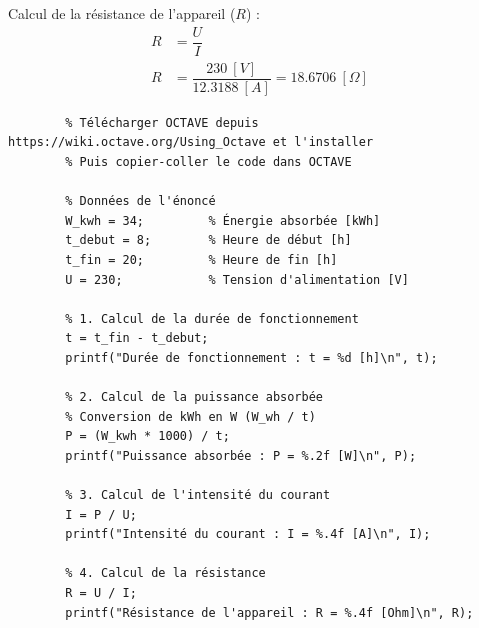 \documentclass[a4paper,11pt,answers,addpoints]{exam}
\begin{document}
\begin{questions}
\begin{solution}
	Calcul de la résistance de l'appareil ($R$) :
	\begin{align*}
		R &= \dfrac{U}{I} \\[6pt]
		R &= \dfrac{\qty{230}{[V]}}{\qty{12,3188}{[A]}} = \qty{18,6706}{[\Omega]}
	\end{align*}
	\vspace{0.5em}
	\begin{verbatim}
		% Télécharger OCTAVE depuis https://wiki.octave.org/Using_Octave et l'installer
		% Puis copier-coller le code dans OCTAVE
		
		% Données de l'énoncé
		W_kwh = 34;         % Énergie absorbée [kWh]
		t_debut = 8;        % Heure de début [h]
		t_fin = 20;         % Heure de fin [h]
		U = 230;            % Tension d'alimentation [V]
		
		% 1. Calcul de la durée de fonctionnement
		t = t_fin - t_debut;
		printf("Durée de fonctionnement : t = %d [h]\n", t);
		
		% 2. Calcul de la puissance absorbée
		% Conversion de kWh en W (W_wh / t)
		P = (W_kwh * 1000) / t;
		printf("Puissance absorbée : P = %.2f [W]\n", P);
		
		% 3. Calcul de l'intensité du courant
		I = P / U;
		printf("Intensité du courant : I = %.4f [A]\n", I);
		
		% 4. Calcul de la résistance
		R = U / I;
		printf("Résistance de l'appareil : R = %.4f [Ohm]\n", R);
	\end{verbatim}
\end{solution}
\end{questions}
\end{document}

